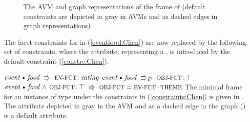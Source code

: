 \documentclass[output=paper,colorlinks,citecolor=brown,chinesefont]{langscibook}
\begin{document}
\begin{figure}[t]
\small
{}
\caption{The AVM and graph representations of the frame of  (default constraints are depicted in gray in AVMs and as dashed edges in graph representations)}
\label{fig:dinner:Chen}
\end{figure}
The facet constraints for \dott{} in (\ref{eventfood:Chen}) are now replaced by the following set of constraints, where the  attribute, representing a , is introduced by the default constraint (\ref{constrc:Chen}).

\ea\label{constraints:Chen}
\ea\label{constrb:Chen}$\type{event}\dott\type{food}~\implic~\feat{ev-fct}\D\type{eating}$
\ex\label{constrc:Chen}$\type{event}\dott\type{food}~\dimplic~\feat{obj-fct}\D\true$
\ex\label{constrd:Chen}$\type{event}\dott\type{food}\und\feat{obj-fct}\D\true~\implic~\feat{obj-fct}\patheq\feat{ev-fct}\CP\feat{theme}$
\z
\z
%
The minimal frame for an instance of type  under the constraints in (\ref{constraints:Chen}) is given in .
The attribute depicted in gray in the AVM and as a dashed edge in the graph () is a default attribute. 
\end{document}
